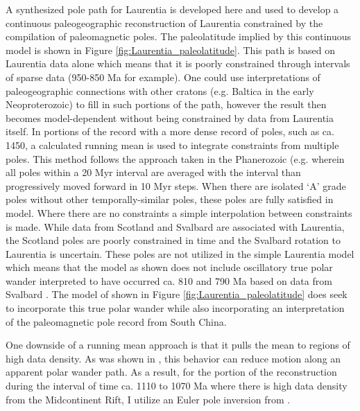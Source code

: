 \documentclass[11pt,letterpaper]{article}
\begin{document}
A synthesized pole path for Laurentia is developed here and used to develop a continuous paleogeographic reconstruction of Laurentia constrained by the compilation of paleomagnetic poles. The paleolatitude implied by this continuous model is shown in Figure \ref{fig:Laurentia_paleolatitude}. This path is based on Laurentia data alone which means that it is poorly constrained through intervals of sparse data (950-850 Ma for example). One could use interpretations of paleogeographic connections with other cratons (e.g. Baltica in the early Neoproterozoic) to fill in such portions of the path, however the result then becomes model-dependent without being constrained by data from Laurentia itself. In portions of the record with a more dense record of poles, such as ca. 1450, a calculated running mean is used to integrate constraints from multiple poles. This method follows the approach taken in the Phanerozoic (e.g. \citealp{Torsvik2012a} wherein all poles within a 20 Myr interval are averaged with the interval than progressively moved forward in 10 Myr steps. When there are isolated `A' grade poles without other temporally-similar poles, these poles are fully satisfied in model. Where there are no constraints a simple interpolation between constraints is made. While data from Scotland and Svalbard are associated with Laurentia, the Scotland poles are poorly constrained in time and the Svalbard rotation to Laurentia is uncertain. These poles are not utilized in the simple Laurentia model which means that the model as shown does not include oscillatory true polar wander interpreted to have occurred ca. 810 and 790 Ma based on data from Svalbard \citep{Maloof2006a}. The model of \cite{Li2013a} shown in Figure \ref{fig:Laurentia_paleolatitude} does seek to incorporate this true polar wander while also incorporating an interpretation of the paleomagnetic pole record from South China. 

One downside of a running mean approach is that it pulls the mean to regions of high data density. As was shown in \cite{Swanson-Hysell2019a}, this behavior can reduce motion along an apparent polar wander path. As a result, for the portion of the reconstruction during the interval of time ca. 1110 to 1070 Ma where there is high data density from the Midcontinent Rift, I utilize an Euler pole inversion from \cite{Swanson-Hysell2019a}.
\end{document}
